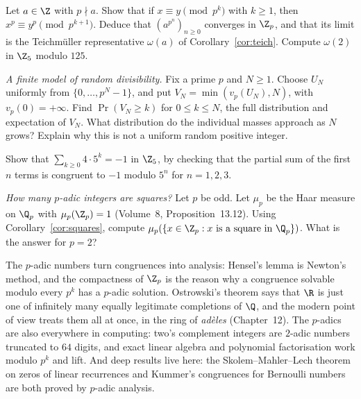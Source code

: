 \begin{exercise}[$\star\star\star$]\label{ex:teich}
Let $a\in\Z$ with $p\nmid a$. Show that if $x\equiv y\pmod{p^k}$ with $k\ge1$, then $x^p\equiv y^p\pmod{p^{k+1}}$. Deduce that $(a^{p^n})_{n\ge0}$ converges in $\Z_p$, and that its limit is the Teichm\"uller representative $\omega(a)$ of Corollary~\ref{cor:teich}. Compute $\omega(2)$ in $\Z_5$ modulo $125$.
\end{exercise}

\begin{exercise}[$\star\star$]\label{ex:t1-random-valuation}
\emph{A finite model of random divisibility.} Fix a prime $p$ and $N\ge1$.
Choose $U_N$ uniformly from $\{0,\dots,p^N-1\}$, and put
$V_N=\min(v_p(U_N),N)$, with $v_p(0)=+\infty$.
Find $\operatorname{Pr}(V_N\ge k)$ for $0\le k\le N$, the full distribution
and expectation of $V_N$. What distribution do the individual masses
approach as $N$ grows? Explain why this is not a uniform random positive integer.
\end{exercise}

\begin{exercise}[$\star$]\label{ex:t1-minusone}
Show that $\sum_{k\ge 0}4\cdot 5^k=-1$ in $\Z_5$, by checking that the partial sum of the first $n$ terms is congruent to $-1$ modulo $5^n$ for $n=1,2,3$.
\end{exercise}

\begin{exercise}[$\star\star$]\label{ex:squareszp}
\emph{How many $p$-adic integers are squares?} Let $p$ be odd. Let $\mu_p$ be the Haar measure on $\Q_p$ with $\mu_p(\Z_p)=1$ (Volume~8, Proposition~13.12). Using Corollary~\ref{cor:squares}, compute $\mu_p(\{x\in\Z_p:x\text{ is a square in }\Q_p\})$. What is the answer for $p=2$?
\end{exercise}

\begin{beauty}
The $p$-adic numbers turn congruences into analysis: Hensel's lemma is Newton's method, and the compactness of $\Z_p$ is the reason why a congruence solvable modulo every $p^k$ has a $p$-adic solution. Ostrowski's theorem says that $\R$ is just one of infinitely many equally legitimate completions of $\Q$, and the modern point of view treats them all at once, in the ring of \emph{ad\`eles} (Chapter~12). The $p$-adics are also everywhere in computing: two's complement integers are $2$-adic numbers truncated to $64$ digits, and exact linear algebra and polynomial factorisation work modulo $p^k$ and lift. And deep results live here: the Skolem--Mahler--Lech theorem on zeros of linear recurrences and Kummer's congruences for Bernoulli numbers are both proved by $p$-adic analysis.
\end{beauty}

